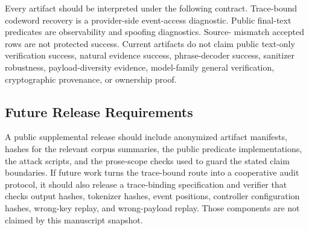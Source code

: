 Every artifact should be interpreted under the following contract.  Trace-bound
codeword recovery is a provider-side event-access diagnostic.  Public
final-text predicates are observability and spoofing diagnostics.  Source-
mismatch accepted rows are not protected success.  Current artifacts do not
claim public text-only verification success, natural evidence success,
phrase-decoder success, sanitizer robustness, payload-diversity evidence,
model-family general verification, cryptographic provenance, or ownership
proof.

\subsection{Future Release Requirements}

A public supplemental release should include anonymized artifact manifests,
hashes for the relevant corpus summaries, the public predicate implementations,
the attack scripts, and the prose-scope checks used to guard the stated claim
boundaries.  If future work
turns the trace-bound route into a cooperative audit protocol, it should also
release a trace-binding specification and verifier that checks output hashes,
tokenizer hashes, event positions, controller configuration hashes, wrong-key
replay, and wrong-payload replay.  Those components are not claimed by this
manuscript snapshot.
